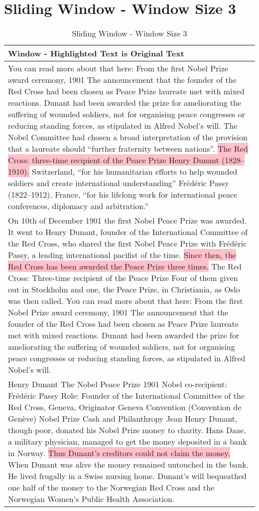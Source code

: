 \section{Sliding Window - Window Size 3}\label{sec:chunking:sliding-window}
\begin{table}[h!]
    \footnotesize
    \begin{xltabular}{\linewidth}{X}
        \toprule
        \textbf{Window} - Highlighted Text is Original Text \\
        \midrule
        You can read more about that here: From the first Nobel Prize award ceremony, 1901 The announcement that the founder of the Red Cross had been chosen as Peace Prize laureate met with mixed reactions. Dunant had been awarded the prize for ameliorating the suffering of wounded soldiers, not for organising peace congresses or reducing standing forces, as stipulated in Alfred Nobel’s will. The Nobel Committee had chosen a broad interpretation of the provision that a laureate should “further fraternity  between nations”. \colorbox{pink}{The Red Cross: three-time recipient of the Peace Prize Henry Dunant (1828–1910).}  Switzerland, “for his humanitarian efforts to help wounded soldiers and create international understanding” Frédéric Passy (1822–1912). France, “for his lifelong work for international peace conferences, diplomacy and arbitration.” \\ \hline
        On 10th of December 1901 the first Nobel Peace Prize was awarded. It went to Henry Dunant, founder of the International Committee of the Red Cross, who shared the first Nobel Peace Prize with Frédéric Passy, a leading international pacifist of the time. \colorbox{pink}{Since then, the Red Cross has been awarded the Peace Prize three times.} The Red Cross: Three-time recipient of the Peace Prize Four of them given out in Stockholm and one, the Peace Prize, in Christiania, as Oslo was then called. You can read more about that here: From the first Nobel Prize award ceremony, 1901 The announcement that the founder of the Red Cross had been chosen as Peace Prize laureate met with mixed reactions.  Dunant had been awarded the prize for ameliorating the suffering of wounded soldiers, not for  organising peace congresses or reducing standing forces, as stipulated in Alfred Nobel’s will. \\ \hline
        Henry Dunant The Nobel Peace Prize 1901 Nobel co-recipient: Frédéric Passy Role: Founder of the International Committee of the Red Cross, Geneva, Originator Geneva  Convention (Convention de Genève) Nobel Prize Cash and Philanthropy Jean Henry Dunant, though poor, donated his Nobel Prize money to charity. Hans Daae, a military physician, managed to get the money deposited in a bank in Norway. \colorbox{pink}{Thus Dunant’s creditors could not claim the money.} When Dunant was alive the money remained untouched in the bank. He lived frugally in a Swiss nursing home. Dunant’s will bequeathed one half of the money to the Norwegian Red Cross and the Norwegian Women’s Public Health Association. \\
        \bottomrule
    \end{xltabular}
    \caption{Sliding Window - Window Size 3}
    \label{tab:table-sliding-window}
\end{table}